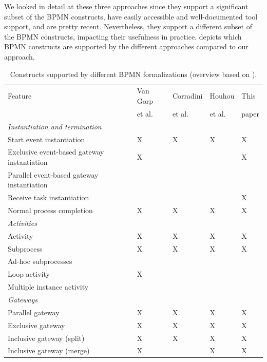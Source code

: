 \documentclass[submission, copyright, creativecommons]{eptcs}
\begin{document}
We looked in detail at these three approaches since they support a significant subset of the BPMN constructs, have easily accessible and well-documented tool support, and are pretty recent.
Nevertheless, they support a different subset of the BPMN constructs, impacting their usefulness in practice.
 depicts which BPMN constructs are supported by the different approaches compared to our approach.

\begin{table}[htbp]
    \caption{Constructs supported by different BPMN formalizations (overview based on \cite{vangorpVisualTokenbasedFormalization2013}).}
    \label{tab:supportedconstructs}
    \begin{threeparttable}
    \begin{tabular}{l l l l l}
    \hline
      Feature & Van Gorp &  Corradini & Houhou & This\\
      & et al. \cite{vangorpVisualTokenbasedFormalization2013} & et al. \cite{corradiniFormalApproachAnalysis2021}& et al. \cite{houhouFirstOrderLogicVerification2022} & paper\\
      \hline
      \textit{Instantiation and termination} & &\\
      Start event instantiation & X & X & X & X\\
      Exclusive event-based gateway instantiation & X & & & X\\
      Parallel event-based gateway instantiation &  & & & \\
      Receive task instantiation & & & & X\\
      Normal process completion & X & X & X & X\\
      \textit{Activities} & & & &\\
      Activity & X & X & X & X\\
      Subprocess & X & X & X & X\\
      Ad-hoc subprocesses & & & &\\
      Loop activity & X & & &\\
      Multiple instance activity & & & & \\
      \textit{Gateways} & & & &\\
      Parallel gateway & X & X & X & X\\
      Exclusive gateway & X & X & X & X\\
      Inclusive gateway (split) & X & X & X & X\\
      Inclusive gateway (merge) & X & & X & X\\

\end{tabular}
\end{threeparttable}
\end{table}
\end{document}
